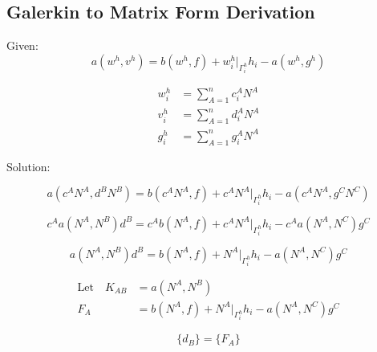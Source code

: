 \documentclass[a4paper, 12pt]{article}
\begin{document}
\newpage
\subsection{Galerkin to Matrix Form Derivation} \label{sec:MatrixDer}

Given:
\begin{equation*}
a(w^{h} , v^{h})
 = b(w^{h} , f)
  + w^{h}_{i}\Big|_{\Gamma^{h}_{i}} h_{i}
  - a(w^{h} , g^{h})
\end{equation*}

\begin{align*}
w^{h}_i &= \sum_{A=1}^{n} c^{A}_i N^{A}  \\
v^{h}_i &= \sum_{A=1}^{n} d^{A}_i N^{A}  \\
g^{h}_i &=  \sum_{A=1}^{n} g^{A}_i N^{A}
\end{align*}

\noindent
Solution:

\begin{equation*}
a(c^{A} N^{A}, d^{B} N^{B})
 = b( c^{A} N^{A} , f)
  + c^{A} N^{A}\Big|_{\Gamma^{h}_{i}} h_{i}
  - a( c^{A} N^{A}, g^{C} N^{C})
\end{equation*}

\begin{equation*}
c^{A} a(N^{A}, N^{B})d^{B}
 = c^{A} b( N^{A} , f)
  + c^{A} N^{A}\Big|_{\Gamma^{h}_{i}} h_{i}
  - c^{A}a( N^{A}, N^{C})g^{C}
\end{equation*}

\begin{equation*}
a(N^{A}, N^{B})d^{B}
 = b( N^{A} , f)
  + N^{A}\Big|_{\Gamma^{h}_{i}} h_{i}
  - a( N^{A}, N^{C})g^{C}
\end{equation*}

\begin{align*}
\text{Let}\quad K_{AB} &= a(N^{A}, N^{B}) \\
F_A &= b( N^{A} , f)
  + N^{A}\Big|_{\Gamma^{h}_{i}} h_{i}
  - a( N^{A}, N^{C})g^{C}
\end{align*}

\begin{equation*}
[ K_{AB} ] \{ d_B \} = \{ F_A \}
\end{equation*}
\end{document}

